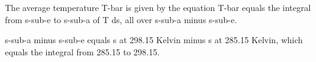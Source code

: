 The average temperature T-bar is given by the equation T-bar equals the integral from s-sub-e to s-sub-a of T ds, all over s-sub-a minus s-sub-e.

s-sub-a minus s-sub-e equals s at 298.15 Kelvin minus s at 285.15 Kelvin, which equals the integral from 285.15 to 298.15.